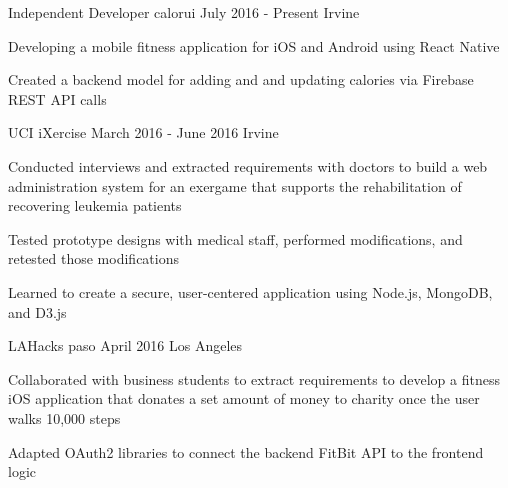

\begin{cventries}

  \cventry
    {Independent Developer} %
    {calorui}
    {July 2016 - Present} %
    {Irvine} %
    {
      \begin{cvitems} %
        \item Developing a mobile fitness application for iOS and Android using React Native
        \item Created a backend model for adding and and updating calories via Firebase REST API calls
      \end{cvitems}
    }

  \cventry
    {UCI}
    {iXercise} %
    {March 2016 - June 2016} 
    {Irvine} 
    {
      \begin{cvitems} %
        \item Conducted interviews and extracted requirements with doctors to build a web administration system for an exergame that supports the rehabilitation of recovering leukemia patients
        \item Tested prototype designs with medical staff, performed modifications, and retested those modifications
        \item Learned to create a secure, user-centered application using Node.js, MongoDB, and D3.js
      \end{cvitems}
    }

  \cventry
  {LAHacks}
  {paso} %
  {April 2016} 
  {Los Angeles} 
  {
  	\begin{cvitems} %
  		\item Collaborated with business students to extract requirements to develop a fitness iOS application that donates a set amount of money to charity once the user walks 10,000 steps
  		\item Adapted OAuth2 libraries to connect the backend FitBit API to the frontend logic
  	\end{cvitems}
  }
  
\end{cventries}
